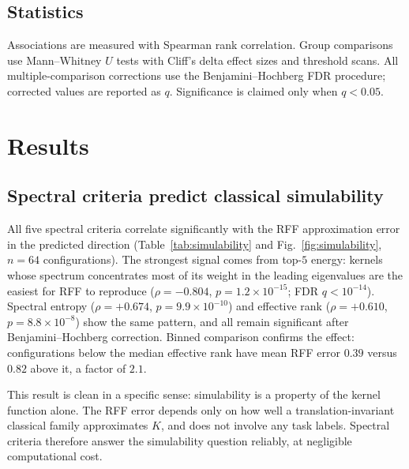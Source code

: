 \documentclass[aps,pra,preprint]{revtex4-2}
\begin{document}
\subsection{Statistics}
\label{sec:methods-stats}

Associations are measured with Spearman rank correlation. Group comparisons use
Mann--Whitney $U$ tests with Cliff's delta effect sizes and threshold scans. All
multiple-comparison corrections use the Benjamini--Hochberg FDR procedure; corrected
values are reported as $q$. Significance is claimed only when $q<0.05$.

\section{Results}
\label{sec:results}

\subsection{Spectral criteria predict classical simulability}
\label{sec:simulability}

All five spectral criteria correlate significantly with the RFF approximation error in the
predicted direction (Table~\ref{tab:simulability} and Fig.~\ref{fig:simulability},
$n=64$ configurations). The strongest signal comes from top-$5$ energy: kernels whose
spectrum concentrates most of its weight in the leading eigenvalues are the easiest for
RFF to reproduce ($\rho=-0.804$, $p=1.2\times10^{-15}$; FDR $q<10^{-14}$). Spectral
entropy ($\rho=+0.674$, $p=9.9\times10^{-10}$) and effective rank ($\rho=+0.610$,
$p=8.8\times10^{-8}$) show the same pattern, and all remain significant after
Benjamini--Hochberg correction. Binned comparison confirms the effect: configurations
below the median effective rank have mean RFF error $0.39$ versus $0.82$ above it, a
factor of $2.1$.

This result is clean in a specific sense: simulability is a property of the kernel
function alone. The RFF error depends only on how well a translation-invariant classical
family approximates $K$, and does not involve any task labels. Spectral criteria
therefore answer the simulability question reliably, at negligible computational cost.
\end{document}
